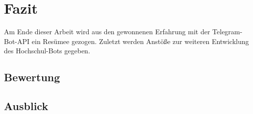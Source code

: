 \chapter{Fazit}
Am Ende dieser Arbeit wird aus den gewonnenen Erfahrung mit der Telegram-Bot-API ein Resümee gezogen. Zuletzt werden Anstöße zur weiteren Entwicklung des Hochschul-Bots gegeben.

\section{Bewertung}
\section{Ausblick}